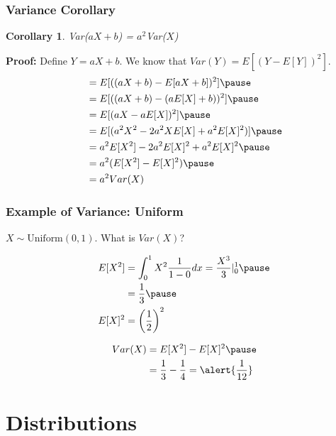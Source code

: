 \documentclass[aspectratio=169, handout]{beamer}
\newtheorem{cor}{Corollary}
\numberwithin{equation}{section}
\begin{document}
\begin{frame}
\frametitle{Variance Corollary} 

\begin{cor}
Var($aX  + b$)  = $a^2$Var($X$) 
\end{cor} 
\pause 

\textbf{Proof:} Define $Y = aX +b$.  We know that $Var(Y) = E[(Y - E[Y])^2]$. \pause 
\begin{align*}
& = E[ ((aX + b) - E[a X + b])^2 ]   \pause \\
& = E[ ((aX + b) - (a E[X] + b))^2 ]   \pause \\
& = E[ (aX -a E[X] )^2 ]  \pause \\
& =  E[ (a^2 X^2 - 2 a^2 X E[X] + a^2 E[X]^2)]  \pause \\
& =  a^2E[X^2] -2a^2E[X]^2 + a^2 E[X]^2   \pause \\
& =  a^2(E[X^2] - E[X]^2) \pause  \\
& =  a^2 Var(X) 
 \end{align*}
\end{frame}







\begin{frame}
\frametitle{Example of Variance: Uniform} 

$X \sim \text{Uniform}(0,1)$.  What is $Var(X)$? \pause   

\begin{align*} 
E[X^2] & =  \int_0^1 X^2 \frac{1}{1-0}dx=\frac{X^3}{3}|_0^1\pause \\
 & =  \frac{1}{3}  \pause \\
E[X]^2 & =  \left(\frac{1}{2}\right)^2   
\end{align*}

\begin{align*}
Var(X) & = E[X^2] - E[X]^2  \pause  \\
& =  \frac{1}{3} - \frac{1}{4} = \alert{\frac{1}{12}}  
\end{align*}

\end{frame}


\section{Distributions}
\end{document}
